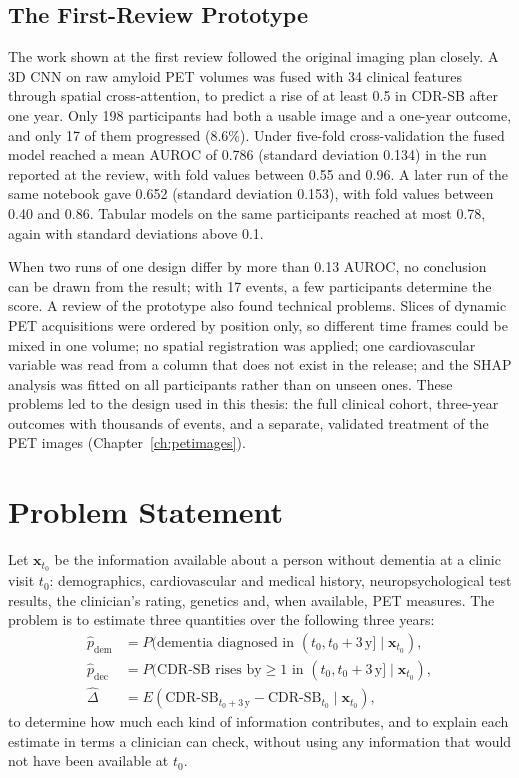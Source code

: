\subsection{The First-Review Prototype}
\label{sec:prelim}
The work shown at the first review followed the original imaging plan closely. A 3D CNN on raw amyloid PET volumes was fused with 34 clinical features through spatial cross-attention, to predict a rise of at least 0.5 in CDR-SB after one year. Only 198 participants had both a usable image and a one-year outcome, and only 17 of them progressed (8.6\%). Under five-fold cross-validation the fused model reached a mean AUROC of 0.786 (standard deviation 0.134) in the run reported at the review, with fold values between 0.55 and 0.96. A later run of the same notebook gave 0.652 (standard deviation 0.153), with fold values between 0.40 and 0.86. Tabular models on the same participants reached at most 0.78, again with standard deviations above 0.1.

When two runs of one design differ by more than 0.13 AUROC, no conclusion can be drawn from the result; with 17 events, a few participants determine the score. A review of the prototype also found technical problems. Slices of dynamic PET acquisitions were ordered by position only, so different time frames could be mixed in one volume; no spatial registration was applied; one cardiovascular variable was read from a column that does not exist in the release; and the SHAP analysis was fitted on all participants rather than on unseen ones. These problems led to the design used in this thesis: the full clinical cohort, three-year outcomes with thousands of events, and a separate, validated treatment of the PET images (Chapter~\ref{ch:petimages}).

\section{Problem Statement}

Let $\mathbf{x}_{t_0}$ be the information available about a person without dementia at a clinic visit $t_0$: demographics, cardiovascular and medical history, neuropsychological test results, the clinician's rating, genetics and, when available, PET measures. The problem is to estimate three quantities over the following three years:
\begin{align}
\hat{p}_{\text{dem}} &= P(\text{dementia diagnosed in } (t_0, t_0+3\,\text{y}] \mid \mathbf{x}_{t_0}), \\
\hat{p}_{\text{dec}} &= P(\text{CDR-SB rises by} \geq 1 \text{ in } (t_0, t_0+3\,\text{y}] \mid \mathbf{x}_{t_0}), \\
\hat{\Delta} &= E(\text{CDR-SB}_{t_0+3\,\text{y}} - \text{CDR-SB}_{t_0} \mid \mathbf{x}_{t_0}),
\end{align}
to determine how much each kind of information contributes, and to explain each estimate in terms a clinician can check, without using any information that would not have been available at $t_0$.

